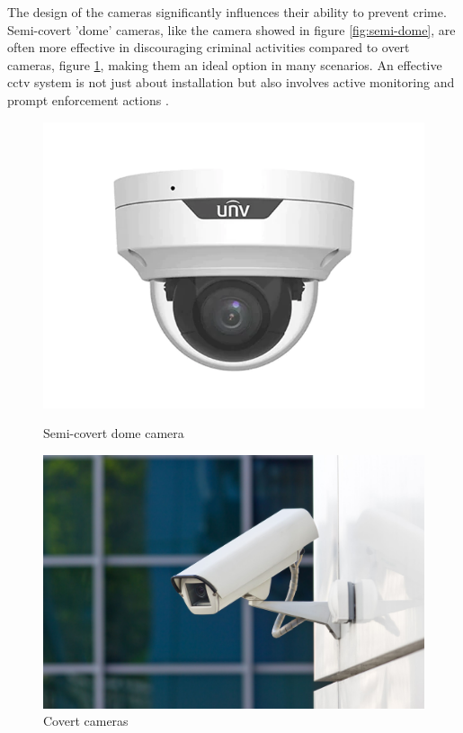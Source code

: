 The design of the cameras significantly influences their ability to prevent crime. Semi-covert 'dome' 
cameras, like the camera showed in figure \ref{fig:semi-dome}, are often more effective in discouraging criminal activities compared 
to overt cameras, figure \ref{fig:covert}, making them an ideal option in many scenarios. An effective 
\ac{cctv} system is not just about installation but also involves active monitoring and prompt enforcement 
actions \cite{rfc4}.
\begin{figure}[h]
    \centering

    \begin{minipage}{0.3\textwidth}
        \centering
        \includegraphics[width=\textwidth]{figs/semi-dome.png} %
        \caption{Semi-covert dome camera}
        \label{fig:semi-dome}
    \end{minipage}
    \hspace{2cm}
    \begin{minipage}{0.32\textwidth}
        \centering
        \includegraphics[width=\textwidth]{figs/overt2.jpg} %
        \caption{Covert cameras}
        \label{fig:covert}
    \end{minipage}
\end{figure}

